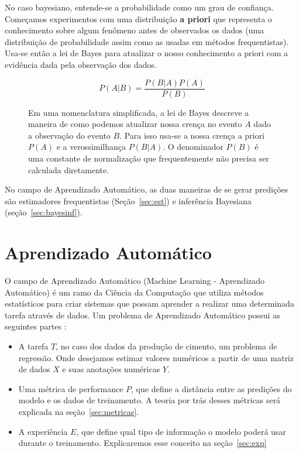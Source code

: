 No caso bayesiano, entende-se a probabilidade como um grau de confiança. Começamos
experimentos com uma distribuição \textbf{a priori} que representa o
conhecimento sobre algum fenômeno antes de observados os dados (uma distribuição
de probabilidade assim como as usadas em métodos frequentistas). Usa-se então a
lei de Bayes para atualizar o nosso conhecimento a priori com a evidência dada
pela observação dos dados.

 \begin{figure} 
\[
  P(A|B)=\frac{P(B|A)P(A)}{P(B)}
\]
\caption{Em uma nomenclatura simplificada, a lei de Bayes descreve a maneira de
  como podemos atualizar nossa crença no evento $A$ dado a observação do evento
  $B$. Para isso usa-se a nossa crença a priori $P(A)$ e a verossimilhança
  $P(B|A)$. O denominador $P(B)$ é uma constante de normalização que
  frequentemente não precisa ser calculada diretamente.}
  \end{figure}




No campo de Aprendizado Automático, as duas maneiras de se gerar predições são estimadores
frequentistas (Seção~\ref{sec:est}) e inferência Bayesiana (seção~\ref{sec:bayesinf}).


\section{Aprendizado Automático}
\label{sec:aprenauto}
O campo de Aprendizado Automático (Machine Learning - Aprendizado Automático) é um ramo da Ciência
da Computação que utiliza métodos estatísticos para criar sistemas que possam
aprender a realizar uma determinada tarefa através de dados. Um problema de Aprendizado Automático possui
as seguintes partes \citep{dlbook}: \\

\begin{itemize}

  
\item A tarefa $T$, no caso dos dados da produção de cimento, um problema de regressão.
  Onde desejamos estimar valores numéricos a partir de uma matriz de dados $X$ e
  suas anotações numéricas $Y$. 
  
\item Uma métrica de performance $P$, que define a distância entre as predições
  do modelo e os dados de treinamento. A teoria por trás desses métricas será explicada na seção~\ref{sec:metricas}.

\item A experiência $E$, que define qual tipo de informação o modelo poderá usar
  durante o treinamento. Explicaremos esse conceito na seção~\ref{sec:exp} 
  
\end{itemize}

